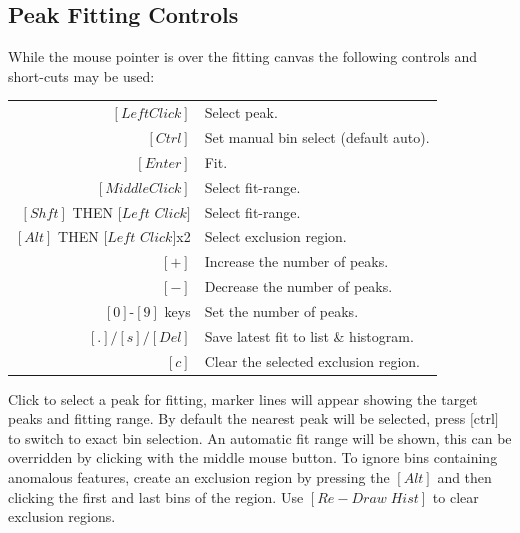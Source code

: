 \documentclass[a4paper,10pt]{article}
\begin{document}
\subsection{Peak Fitting Controls}
While the mouse pointer is over the fitting canvas the following controls and short-cuts may be used:
\begin{center}
\begin{tabular}{ r l }
$[Left Click]$ & Select peak.\\
$[Ctrl]$ & Set manual bin select (default auto).\\
$[Enter]$ & Fit.\\
$[Middle Click]$ & Select fit-range.\\
$[Shft]$ THEN $[Left$ $Click]$ & Select fit-range.\\
$[Alt]$ THEN $[Left$ $Click]$x2 & Select exclusion region.\\
$[+]$ & Increase the number of peaks.\\
$[-]$ & Decrease the number of peaks.\\
$[0]$-$[9]$ keys & Set the number of peaks.\\
$[.]/[s]/[Del]$ & Save latest fit to list \& histogram.\\
$[c]$ & Clear the selected exclusion region.\\
\end{tabular}
\end{center}

Click to select a peak for fitting, marker lines will appear showing the target peaks and fitting range. By default the nearest peak will be selected, press $[$ctrl$]$ to switch to exact bin selection. An automatic fit range will be shown, this can be overridden by clicking with the middle mouse button. To ignore bins containing anomalous features, create an exclusion region by pressing the $[Alt]$ and then clicking the first and last bins of the region. Use $[Re-Draw\;Hist]$ to clear exclusion regions.
  
\end{document}
